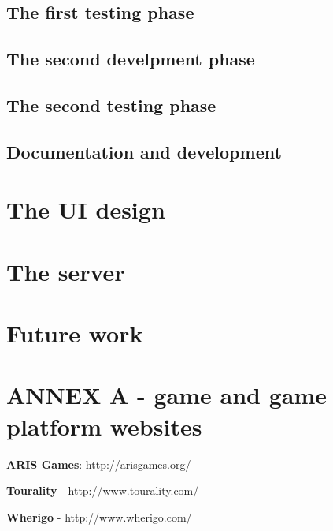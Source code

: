 \documentclass{article}
\begin{document}
  



\subsection{The first testing phase}

\subsection{The second develpment phase}

\subsection{The second testing phase}

\subsection{Documentation and development}


\section{The UI design}

\section{The server}

\section{Future work}







\section{ANNEX A - game and game platform websites}



\nocite{teamtags}
\nocite{gps1}



\textbf{ARIS Games}: http://arisgames.org/ \newline

\textbf{Tourality} - http://www.tourality.com/ \newline

\textbf{Wherigo} - http://www.wherigo.com/ \newline
\end{document}
